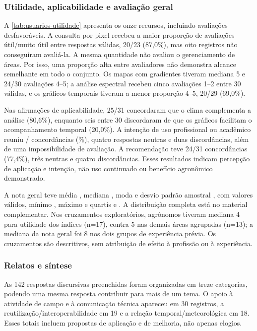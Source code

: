 \subsubsection{Utilidade, aplicabilidade e avaliação geral}

A \cref{tab:usuarios-utilidade} apresenta os onze recursos, incluindo avaliações desfavoráveis. A consulta por pixel recebeu a maior proporção de avaliações útil/muito útil entre respostas válidas, 20/23 (87,0\%), mas oito registros não conseguiram avaliá-la. A mesma quantidade não avaliou o gerenciamento de áreas. Por isso, uma proporção alta entre avaliadores não demonstra alcance semelhante em todo o conjunto. Os mapas com gradientes tiveram mediana 5 e 24/30 avaliações 4--5; a análise espectral recebeu cinco avaliações 1--2 entre 30 válidas, e os gráficos temporais tiveram a menor proporção 4--5, 20/29 (69,0\%).



Nas afirmações de aplicabilidade, 25/31 concordaram que o clima complementa a análise (80,6\%), enquanto seis entre 30 discordaram de que os gráficos facilitam o acompanhamento temporal (20,0\%). A intenção de uso profissional ou acadêmico reuniu \UsIntencaoPos{}/\UsIntencaoN{} concordâncias (\UsIntencaoPct\%), quatro respostas neutras e duas discordâncias, além de uma impossibilidade de avaliação. A recomendação teve 24/31 concordâncias (77,4\%), três neutras e quatro discordâncias. Esses resultados indicam percepção de aplicação e intenção, não uso continuado ou benefício agronômico demonstrado.

A nota geral teve média \UsuariosMedia{}, mediana \UsuariosMediana{}, moda \UsuariosModa{} e desvio padrão amostral \UsuariosDP{}, com \UsuariosN{} valores válidos, mínimo \UsuariosMinimo{}, máximo \UsuariosMaximo{} e quartis \UsuariosQum{} e \UsuariosQtres{}. A distribuição completa está no material complementar. Nos cruzamentos exploratórios, agrônomos tiveram mediana 4 para utilidade dos índices (n=17), contra 5 nas demais áreas agrupadas (n=13); a mediana da nota geral foi 8 nos dois grupos de experiência prévia. Os cruzamentos são descritivos, sem atribuição de efeito à profissão ou à experiência.

\subsubsection{Relatos e síntese}

As 142 respostas discursivas preenchidas foram organizadas em treze categorias, podendo uma mesma resposta contribuir para mais de um tema. O apoio à atividade de campo e à comunicação técnica apareceu em 30 registros, a reutilização/interoperabilidade em 19 e a relação temporal/meteorológica em 18. Esses totais incluem propostas de aplicação e de melhoria, não apenas elogios.

